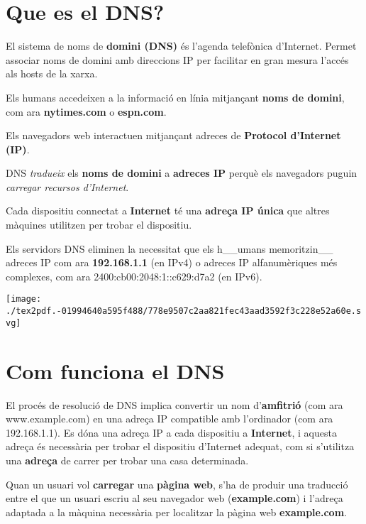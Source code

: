 \documentclass[]{article}
\begin{document}
\hypertarget{que-es-el-dns}{%
\section{\texorpdfstring{\textbf{Que es el
DNS?}}{Que es el DNS?}}\label{que-es-el-dns}}

El sistema de noms de \textbf{domini (DNS)} és l'agenda telefònica
d'Internet. Permet associar noms de domini amb direccions IP per
facilitar en gran mesura l'accés als hosts de la xarxa.

Els humans accedeixen a la informació en línia mitjançant \textbf{noms
de domini}, com ara \textbf{nytimes.com} o \textbf{espn.com}.

Els navegadors web interactuen mitjançant adreces de \textbf{Protocol
d'Internet (IP)}.

DNS \emph{tradueix} els \textbf{noms de domini} a \textbf{adreces IP}
perquè els navegadors puguin \emph{carregar recursos d'Internet}.

Cada dispositiu connectat a \textbf{Internet} té una \textbf{adreça IP
única} que altres màquines utilitzen per trobar el dispositiu.

Els servidors DNS eliminen la necessitat que els h\_\_umans
memoritzin\_\_ adreces IP com ara \textbf{192.168.1.1} (en IPv4) o
adreces IP alfanumèriques més complexes, com ara
2400:cb00:2048:1::c629:d7a2 (en IPv6).

\texttt{[image: ./tex2pdf.-01994640a595f488/778e9507c2aa821fec43aad3592f3c228e52a60e.svg]}

\hypertarget{com-funciona-el-dns}{%
\section{\texorpdfstring{\textbf{Com funciona el
DNS}}{Com funciona el DNS}}\label{com-funciona-el-dns}}

El procés de resolució de DNS implica convertir un nom
d'\textbf{amfitrió} (com ara www.example.com) en una adreça IP
compatible amb l'ordinador (com ara 192.168.1.1). Es dóna una adreça IP
a cada dispositiu a \textbf{Internet}, i aquesta adreça és necessària
per trobar el dispositiu d'Internet adequat, com si s'utilitza una
\textbf{adreça} de carrer per trobar una casa determinada.

Quan un usuari vol \textbf{carregar} una \textbf{pàgina web}, s'ha de
produir una traducció entre el que un usuari escriu al seu navegador web
(\textbf{example.com}) i l'adreça adaptada a la màquina necessària per
localitzar la pàgina web \textbf{example.com}.
\end{document}
